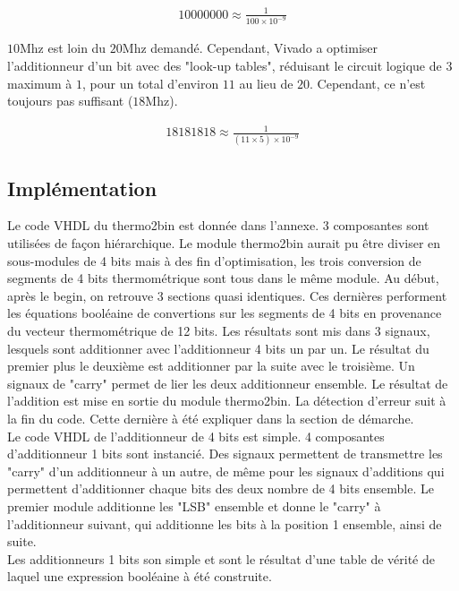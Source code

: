 \documentclass[a11paper]{article}
\begin{document}
\begin{align}
  10000000 \approx \frac{1}{100\times10^{-9}}
\end{align}

$10\text{Mhz}$ est loin du $20\text{Mhz}$ demandé. Cependant, Vivado a optimiser l'additionneur d'un bit avec des "look-up tables",
réduisant le circuit logique de $3$ maximum à $1$, pour un total d'environ $11$ au lieu de $20$. Cependant, ce n'est toujours pas
suffisant ($18\text{Mhz}$).

\begin{align}
  18181818 \approx \frac{1}{(11\times5)\times10^{-9}}
\end{align}

\subsection{Implémentation}
Le code VHDL du thermo2bin est donnée dans l'annexe. 3 composantes sont utilisées de façon hiérarchique. Le module thermo2bin aurait pu
être diviser en sous-modules de 4 bits mais à des fin d'optimisation, les trois conversion de segments de 4 bits thermométrique sont tous
dans le même module. Au début, après le begin, on retrouve 3 sections quasi identiques. Ces dernières performent les équations booléaine
de convertions sur les segments de 4 bits en provenance du vecteur thermométrique de 12 bits. Les résultats sont mis dans 3 signaux,
lesquels sont additionner avec l'additionneur 4 bits un par un. Le résultat du premier plus le deuxième est additionner par la suite avec
le troisième. Un signaux de "carry" permet de lier les deux additionneur ensemble. Le résultat de l'addition est mise en sortie du module
thermo2bin. La détection d'erreur suit à la fin du code. Cette dernière à été expliquer dans la section de démarche.
\\
Le code VHDL de l'additionneur de 4 bits est simple. 4 composantes d'additionneur 1 bits sont instancié. Des signaux permettent de
transmettre les "carry" d'un additionneur à un autre, de même pour les signaux d'additions qui permettent d'additionner chaque bits des
deux nombre de 4 bits ensemble. Le premier module additionne les "LSB" ensemble et donne le "carry" à l'additionneur suivant, qui additionne
les bits à la position 1 ensemble, ainsi de suite.
\\
Les additionneurs 1 bits son simple et sont le résultat d'une table de vérité de laquel une expression booléaine à été construite.
\end{document}
